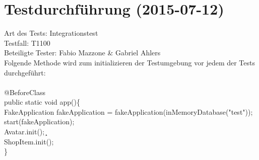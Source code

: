 \chapter{Testdurchführung (2015-07-12)}

Art des Tests: Integrationstest\\
Testfall: T1100\\
Beteiligte Tester: Fabio Mazzone \& Gabriel Ahlers\\

Folgende Methode wird zum initializieren der Testumgebung vor jedem der Tests durchgeführt:\\\\
\hspace*{0mm}@BeforeClass \\
\hspace*{0mm}public static void app()\{ \\
\hspace*{3mm}FakeApplication fakeApplication = fakeApplication(inMemoryDatabase("test")); \\
\hspace*{3mm}start(fakeApplication); \\
\hspace*{3mm}Avatar.init();¸\\
\hspace*{3mm}ShopItem.init(); \\
\hspace*{0mm}\} \\\\

